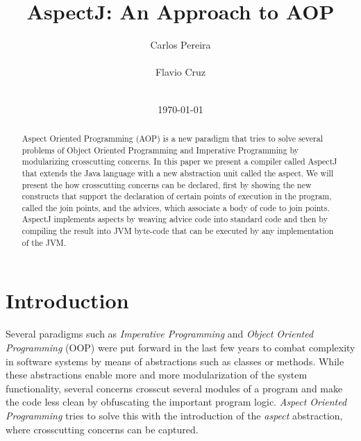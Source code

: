 \documentclass{template}
\begin{document}
\title{AspectJ: An Approach to AOP}


\author{
\alignauthor
Carlos Pereira\\
       \\
\alignauthor
Flavio Cruz\\
       \\
}
\date{\today}

\maketitle
\begin{abstract}
Aspect Oriented Programming (AOP) is a new paradigm that tries to solve several problems of
Object Oriented Programming and Imperative Programming by modularizing crosscutting concerns.
In this paper we present a compiler called AspectJ that extends
the Java language with a new abstraction unit called the aspect. We will present the
how crosscutting concerns can be declared, first by showing the new constructs that support
the declaration of certain points of execution in the program, called the join points, and the
advices, which associate a body of code to join points. AspectJ implements aspects by weaving advice
code into standard code and then by compiling the result into JVM byte-code that can be
executed by any implementation of the JVM.
 
\end{abstract}


\section{Introduction}

Several paradigms such as \emph{Imperative Programming} and \emph{Object Oriented Programming} (OOP) were put forward in the last few years
to combat complexity in software systems by means of abstractions such as classes or methods. While these abstractions enable
more and more modularization of the system functionality, several concerns crosscut several modules of a program and make
the code less clean by obfuscating the important program logic. \emph{Aspect Oriented Programming} tries to solve this
with the introduction of the \emph{aspect} abstraction, where crosscutting concerns can be captured.
\end{document}
